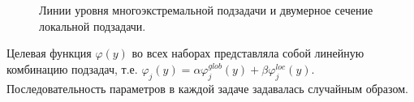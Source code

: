 \documentclass[11pt, oneside, a4paper]{article}
\begin{document}
\begin{figure}[h!]
\begin{minipage}{0.5\linewidth}
\end{minipage}
\begin{minipage}{0.5\linewidth}
\end{minipage}
\caption{Линии уровня многоэкстремальной подзадачи и двумерное сечение локальной подзадачи.}
\label{fig}
\end{figure}
\newpage
Целевая функция $\varphi(y)$ во всех наборах представляла собой линейную комбинацию подзадач, т.е. $\varphi_j(y) = \alpha \varphi_j^{glob}(y) + \beta \varphi_j^{loc}(y)$. Последовательность параметров в каждой задаче задавалась случайным образом. 
\end{document}
